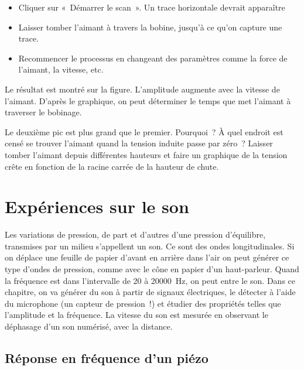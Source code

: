 \documentclass[a4paper,12pt,french]{sphinxmanual}
\begin{document}
\begin{itemize}
\item {} 
Cliquer sur « Démarrer le scan ». Un trace horizontale devrait
apparaître

\item {} 
Laisser tomber l’aimant à travers la bobine, jusqu’à ce qu’on capture
une trace.

\item {} 
Recommencer le processus en changeant des paramètres comme la force
de l’aimant, la vitesse, etc.

\end{itemize}


Le résultat est montré sur la figure. L’amplitude augmente avec la
vitesse de l’aimant. D’après le graphique, on peut déterminer le temps
que met l’aimant à traverser le bobinage.

Le deuxième pic est plus grand que le premier. Pourquoi ? À quel endroit
est censé se trouver l’aimant quand la tension induite passe par zéro ?
Laisser tomber l’aimant depuis différentes hauteurs et faire un
graphique de la tension crête en fonction de la racine carrée de la
hauteur de chute.


\chapter{Expériences sur le son}
\label{\detokenize{index:experiences-sur-le-son}}
Les variations de pression, de part et d’autres d’une pression
d’équilibre, transmises par un milieu s’appellent un son. Ce sont des
ondes longitudinales. Si on déplace une feuille de papier d’avant en
arrière dans l’air on peut générer ce type d’ondes de pression, comme
avec le cône en papier d’un haut-parleur. Quand la fréquence est dans
l’intervalle de 20 à 20000 Hz, on peut entre le son. Dans ce chapitre,
on va générer du son à partir de signaux électriques, le détecter à
l’aide du microphone (un capteur de pression !) et étudier des
propriétés telles que l’amplitude et la fréquence. La vitesse du son
est mesurée en observant le déphasage d’un son numérisé, avec la
distance.


\section{Réponse en fréquence d’un piézo}
\label{\detokenize{5.1:reponse-en-frequence-dun-piezo}}\label{\detokenize{5.1::doc}}
\end{document}

